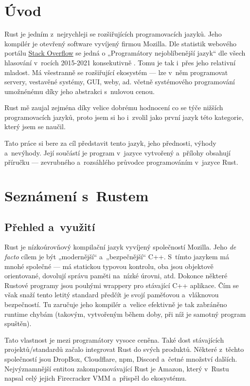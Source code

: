 \documentclass[a4paper, 12pt, twoside]{article} %
\begin{document}
\tableofcontents

\newpage


\section*{Úvod}
	Rust je jedním z~nejrychleji se rozšiřujících programovacích jazyků. Jeho kompilér je otevřený software vyvíjený firmou Mozilla. Dle statistik webového portálu \href{https://stackoverflow.com/}{Stack Overflow} se jedná o  „Programátory nejoblíbenější jazyk“ dle všech hlasování v~rocích 2015-2021 konsekutivně \cite{stack}. Tomu je tak i~přes jeho relativní mladost. Má všestranně se rozšiřující ekosystém — lze v~něm programovat servery, vestavěné systémy, GUI, weby, ad. včetně systémového programování umožnénému díky jeho abstrakci s~nulovou cenou.

	Rust mě zaujal zejména díky velice dobrému hodnocení co se týče nižších programovacích jazyků, proto jsem si ho i~zvolil jako první jazyk této kategorie, který jsem se naučil.
	
	Tato práce si bere za cíl představit tento jazyk, jeho přednosti, výhody a~nevýhody. Její součástí je program v~jazyce vytvořený a~přílohy obsahují příručku — zevrubného a~rozsáhlého průvodce programováním v~jazyce Rust.

\section*{Seznámení s~Rustem}
	\subsection{Přehled a~využití}
		Rust je nízkoúrovňový kompilační jazyk vyvíjený společností Mozilla. Jeho \textit{de facto} cílem je být „modernější“ a~„bezpečnější“ C++. S~tímto jazykem má mnohé společné — má statickou typovou kontrolu, oba jsou objektově orientované, dovolují správu paměti na~nízké úrovni, atd. Dokonce některé Rustové programy jsou pouhými wrappery pro stávající C++ aplikace. Čím se však snaží tento letitý standard předčít je svojí paměťovou a~vláknovou bezpečností. Tu zaručuje jeho kompilér a~velice efektivně je tak zabráněno runtime chybám (takovým, vytvořeným během doby, při níž je samotný program spuštěn).

		Tato vlastnost je mezi programátory vysoce ceněna. Také dost stávajících projektů/standardů začalo integrovat Rust do svých produktů. Některé z~těchto společností jsou DropBox\cite{dropbox}, Cloudflare\cite{cloudflare}, npm\cite{npm}, Discord\cite{discord} a~četné množství dalších. Nejvýznamnější entitou zakomponovávající Rust je Amazon\cite{amazon}, který v~Rustu napsal celý jejich Firecracker VMM a~přispěl do ekosystému.
\end{document}
